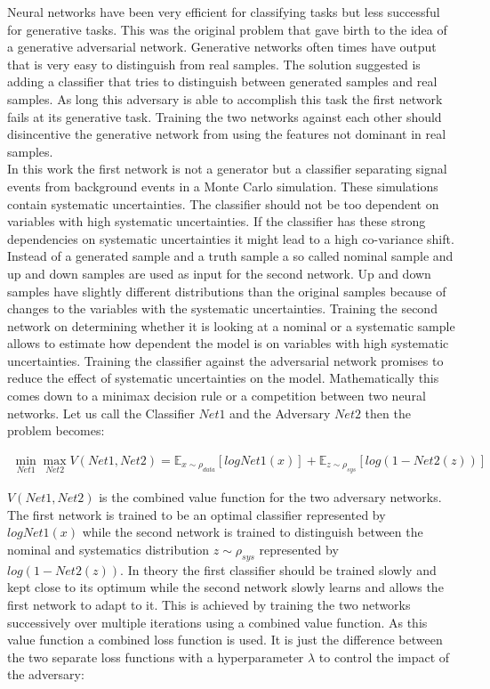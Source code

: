Neural networks have been very efficient for classifying tasks but less successful for generative tasks. This was the original problem that gave birth to the idea of a generative adversarial network. Generative networks often times have output that is very easy to distinguish from real samples. The solution suggested is adding a classifier that tries to distinguish between generated samples and real samples. As long this adversary is able to accomplish this task the first network fails at its generative task. Training the two networks against each other should disincentive the generative network from using the features not dominant in real samples.\\
In this work the first network is not a generator but a classifier separating signal events from background events in a Monte Carlo simulation. These simulations contain systematic uncertainties. The classifier should not be too dependent on variables with high systematic uncertainties. If the classifier has these strong dependencies on systematic uncertainties it might lead to a high co-variance shift. Instead of a generated sample and a truth sample a so called nominal sample and up and down samples are used as input for the second network. Up and down samples have slightly different distributions than the original samples because of changes to the variables with the systematic uncertainties. Training the second network on determining whether it is looking at a nominal or a systematic sample allows to estimate how dependent the model is on variables with high systematic uncertainties. Training the classifier against the adversarial network promises to reduce the effect of systematic uncertainties on the model.
Mathematically this comes down to a minimax decision rule or a competition between two neural networks. Let us call the Classifier $Net1$ and the Adversary $Net2$ then the problem becomes:

\begin{align}
    \min_{Net1} \max_{Net2} V(Net1, Net2) = \mathbb{E}_{\mathit{x} \sim \rho_{data}} [ log Net1(\mathit{x}) ] + \mathbb{E}_{\mathit{z} \sim \rho_{sys}} [ log (1 - Net2(\mathit{z}) ) ]
\end{align}

$V(Net1, Net2)$ is the combined value function for the two adversary networks. The first network is trained to be an optimal classifier represented by $log Net1(\mathit{x})$ while the second network is trained to distinguish between the nominal and systematics distribution $\mathit{z} \sim \rho_{sys}$ represented by $log (1 - Net2(\mathit{z}))$. In theory the first classifier should be trained slowly and kept close to its optimum while the second network slowly learns and allows the first network to adapt to it. This is achieved by training the two networks successively over multiple iterations using a combined value function.
As this value function a combined loss function is used. It is just the difference between the two separate loss functions with a hyperparameter $\lambda$ to control the impact of the adversary:

